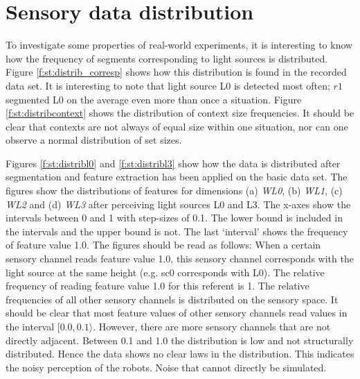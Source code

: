 \chapter{Sensory data distribution}\label{a:dataset}

To investigate some properties of real-world experiments, it is interesting to know how the frequency of segments corresponding to light sources is distributed. Figure \ref{f:st:distrib_corresp} shows how this distribution is found in the recorded data set. It is interesting to note that light source L0 is detected most often; $r1$ segmented L0 on the average even more than once a situation. Figure \ref{f:st:distribcontext} shows the distribution of context size frequencies. It should be clear that contexts are not always of equal size within one situation, nor can one observe a normal distribution of set sizes.

Figures \ref{f:st:distribl0} and \ref{f:st:distribl3} show how the data is distributed after segmentation and feature extraction has been applied on the basic data set. The figures show the distributions of features for dimensions (a) {\em WL0}, (b) {\em WL1}, (c) {\em WL2} and (d) {\em WL3} after perceiving light sources L0 and L3. The x-axes show the intervals between 0 and 1 with step-sizes of 0.1. The lower bound is included in the intervals and the upper bound is not. The last `interval' shows the frequency of feature value 1.0. The figures should be read as follows: When a certain sensory channel reads feature value 1.0, this sensory channel corresponds with the light source at the same height (e.g. sc0 corresponds with L0). The relative frequency of reading feature value 1.0 for this referent is 1. The relative frequencies of all other sensory channels is distributed on the sensory space. It should be clear that most feature values of other sensory channels read values in the interval $[0.0,0.1\rangle$. 
However, there are more sensory channels that are not directly adjacent. Between 0.1 and 1.0 the distribution is low and not structurally distributed. Hence the data shows no clear laws in the distribution. This indicates the noisy perception of the robots. Noise that cannot directly be simulated.

